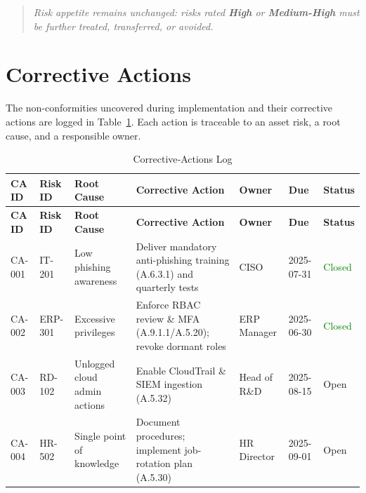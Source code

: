 \begin{quotation}
  \emph{Risk appetite remains unchanged: risks rated \textbf{High} or
  \textbf{Medium-High} must be further treated, transferred, or avoided.}
\end{quotation}

\section{Corrective Actions}
\label{sec:corrective_actions}

The non-conformities uncovered during implementation and their corrective
actions are logged in Table~\ref{tab:corrective_actions}. Each action is
traceable to an asset risk, a root cause, and a responsible owner.

\begin{longtable}{|p{1cm}|p{1.2cm}|p{3cm}|p{4.5cm}|p{2cm}|p{1.5cm}|p{1.5cm}|}
  \caption{Corrective‐Actions Log\label{tab:corrective_actions}}\\
  \hline
  \textbf{CA ID} & \textbf{Risk ID} & \textbf{Root Cause} & \textbf{Corrective Action} & \textbf{Owner} & \textbf{Due} & \textbf{Status}\\
  \hline
  \endfirsthead
  \hline
  \textbf{CA ID} & \textbf{Risk ID} & \textbf{Root Cause} & \textbf{Corrective Action} & \textbf{Owner} & \textbf{Due} & \textbf{Status}\\
  \hline
  \endhead
  CA-001 & IT-201 & Low phishing awareness & Deliver mandatory anti-phishing training (A.6.3.1) and quarterly tests & \ac{CISO} & 2025-07-31 & \textcolor{green}{Closed}\\
  \hline
  CA-002 & ERP-301 & Excessive privileges & Enforce RBAC review \& MFA (A.9.1.1/A.5.20); revoke dormant roles & ERP Manager & 2025-06-30 & \textcolor{green}{Closed}\\
  \hline
  CA-003 & RD-102 & Unlogged cloud admin actions & Enable CloudTrail \& SIEM ingestion (A.5.32) & Head of R\&D & 2025-08-15 & Open\\
  \hline
  CA-004 & HR-502 & Single point of knowledge & Document procedures; implement job-rotation plan (A.5.30) & HR Director & 2025-09-01 & Open\\
  \hline
\end{longtable}

